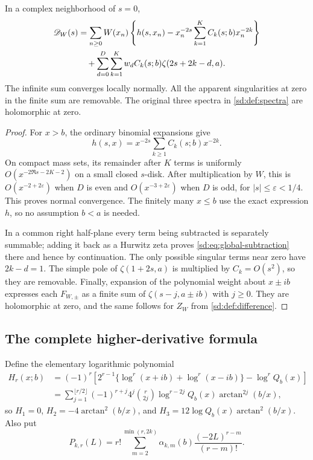 \begin{lemma}
\label{sd:lem:subtraction}
In a complex neighborhood of $s=0$,
\begin{align}
 \mathscr D_W(s)
 &=\sum_{n\ge0}W(x_n)
 \left\{h(s,x_n)-x_n^{-2s}
                  \sum_{k=1}^{K}C_k(s;b)x_n^{-2k}\right\}
 \notag\\
 &\quad+\sum_{d=0}^{D}\sum_{k=1}^{K}
         w_dC_k(s;b)\zeta(2s+2k-d,a).
 \label{sd:eq:global-subtraction}
\end{align}
The infinite sum converges locally normally.  All the apparent
singularities at zero in the finite sum are removable.  The original
three spectra in \eqref{sd:def:spectra} are holomorphic at zero.
\end{lemma}
\begin{proof}
For $x>b$, the ordinary binomial expansions give
\[
 h(s,x)=x^{-2s}\sum_{k\ge1}C_k(s;b)x^{-2k}.
\]
On compact mass sets, its remainder after $K$ terms is uniformly
$O(x^{-2\Re s-2K-2})$ on a small closed $s$-disk.  After multiplication
by $W$, this is $O(x^{-2+2\varepsilon})$ when $D$ is even and
$O(x^{-3+2\varepsilon})$ when $D$ is odd, for $|s|\le\varepsilon<1/4$.
This proves normal convergence.  The finitely many $x\le b$ use the
exact expression $h$, so no assumption $b<a$ is needed.

In a common right half-plane every term being subtracted is separately
summable; adding it back as a Hurwitz zeta proves
\eqref{sd:eq:global-subtraction} there and hence by continuation.
The only possible singular terms near zero have $2k-d=1$.
The simple pole of $\zeta(1+2s,a)$ is multiplied by $C_k=O(s^2)$,
so they are removable.  Finally, expansion of the polynomial weight
about $x\pm ib$ expresses each $F_{W,\pm}$ as a finite sum of
$\zeta(s-j,a\pm ib)$ with $j\ge0$.  They are holomorphic at zero,
and the same follows for $Z_W$ from \eqref{sd:def:difference}.
\end{proof}

\subsection{The complete higher-derivative formula}

Define the elementary logarithmic polynomial
\begin{align}
 H_r(x;b)
 &=(-1)^r\left[2^{r-1}
       \{\log^r(x+ib)+\log^r(x-ib)\}-\log^r Q_b(x)\right]
       \label{sd:eq:H-log}\\
 &=\sum_{j=1}^{\lfloor r/2\rfloor}
       (-1)^{r+j}4^j\binom r{2j}
       \log^{r-2j}Q_b(x)\arctan^{2j}(b/x),
       \label{sd:eq:H-real}
\end{align}
so $H_1=0$, $H_2=-4\arctan^2(b/x)$, and
$H_3=12\log Q_b(x)\arctan^2(b/x)$.  Also put
\begin{equation}\label{sd:eq:Pr}
 P_{k,r}(L)=r!\sum_{m=2}^{\min(r,2k)}
          \alpha_{k,m}(b)\frac{(-2L)^{r-m}}{(r-m)!}.
\end{equation}

